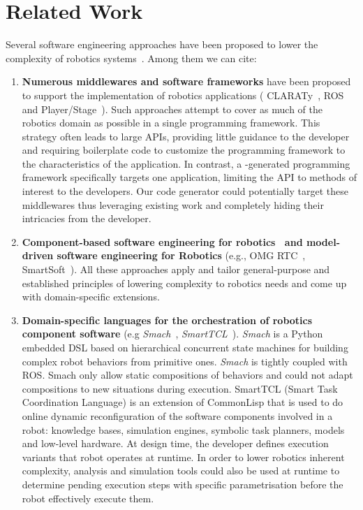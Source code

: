 
\section{Related Work}
\label{sec:related}

Several software engineering approaches have been proposed to lower
the complexity of robotics systems~\cite{Brug07a}. Among them we can cite:

\begin{enumerate}
\item {\bf Numerous middlewares and software frameworks} have been proposed to
support the implementation of robotics applications (\eg{}
CLARATy~\cite{Claraty}, ROS~\cite{ROS} and Player/Stage~\cite{Coll05a}).
Such approaches attempt to cover as much of the robotics domain as
possible in a single programming framework. This strategy often leads
to large APIs, providing little guidance to the developer and
requiring boilerplate code to customize the programming framework to
the characteristics of the application. In contrast, a
\diaspec{}-generated programming framework specifically targets one
application, limiting the API to methods of interest to the
developers. Our code generator could potentially target these
middlewares thus leveraging existing work and completely hiding their
intricacies from the developer.

\item {\bf Component-based software engineering for robotics~\cite{Brug07b} and
model-driven software engineering for Robotics} (e.g., OMG
RTC~\cite{OMGRTC}, SmartSoft~\cite{Schl09a}). All these approaches
apply and tailor general-purpose and established principles of
lowering complexity to robotics needs and come up with domain-specific
extensions.

\item {\bf Domain-specific languages for the orchestration of robotics component software} (e.g \emph{Smach}~\cite{Boren10a}, \emph{SmartTCL}~\cite{Stec11a}). \emph{Smach} is a Python embedded DSL based on hierarchical concurrent state machines for building complex robot behaviors from primitive ones. \emph{Smach} is tightly coupled with ROS. Smach only allow static compositions of behaviors and could not adapt compositions to new situations during execution.
SmartTCL (Smart Task Coordination Language) is an extension of CommonLisp that is used to do online dynamic reconfiguration of the software components involved in a robot: knowledge bases, simulation engines, symbolic task planners, models and low-level hardware. At design time, the developer defines execution variants that robot operates at runtime. In order to lower robotics inherent complexity, analysis and simulation tools could also be used at runtime to determine pending execution steps with specific parametrisation before the robot effectively execute them.


\end{enumerate}
